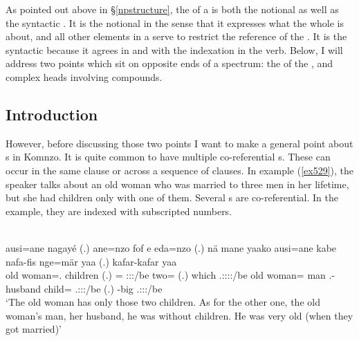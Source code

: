 As pointed out above in {\S}\ref{npstructure}, the  of a  is both the notional  as well as the syntactic . It is the notional  in the sense that it expresses what the whole  is about, and all other elements in a  serve to restrict the reference of the . It is the syntactic  because it agrees in  and  with the indexation in the verb. Below, I will address two points which sit on opposite ends of a spectrum: the  of the , and complex heads involving compounds.

\subsection{Introduction}

However, before discussing those two points I want to make a general point about s in Komnzo. It is quite common to have multiple co-referential s. These can occur in the same clause or across a sequence of clauses. In example (\ref{ex529}), the speaker talks about an old woman who was married to three men in her lifetime, but she had children only with one of them. Several s are co-referential. In the example, they are indexed with subscripted numbers.

\begin{exe}
	\\
	\gll ausi=ane nagayé (.) ane=nzo fof e eda=nzo (.) nä mane yaako ausi=ane kabe nafa-fis nge=mär yaa (.) kafar-kafar yaa\\
	{old woman=\Poss.\Sg} children (.) \Dem={\Only} {\Emph} \Stdu:\Sbj:\Nonpast:\Ipfv/be two={\Only} (.) {\Indf} which \Tsg.\Masc:\Sbj:\Pst:\Ipfv:\Andat/be {old woman=\Poss} man \Third.\Poss-husband child={\Priv} \Tsg.\Masc:\Sbj:\Pst:\Ipfv/be (.) \Redup-big \Tsg.\Masc:\Sbj:\Pst:\Ipfv/be\\
	\trans `The old woman has only those two children. As for the other one, the old woman's man, her husband, he was without children. He was very old (when they got married)'
	\label{ex529}
\end{exe}

